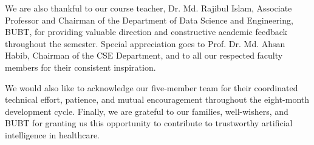 \documentclass[12pt,a4paper]{report}
\begin{document}
We are also thankful to our course teacher, Dr. Md. Rajibul Islam, Associate Professor and Chairman of the Department of Data Science and Engineering, BUBT, for providing valuable direction and constructive academic feedback throughout the semester. Special appreciation goes to Prof. Dr. Md. Ahsan Habib, Chairman of the CSE Department, and to all our respected faculty members for their consistent inspiration.

We would also like to acknowledge our five-member team for their coordinated technical effort, patience, and mutual encouragement throughout the eight-month development cycle. Finally, we are grateful to our families, well-wishers, and BUBT for granting us this opportunity to contribute to trustworthy artificial intelligence in healthcare.
\end{document}
